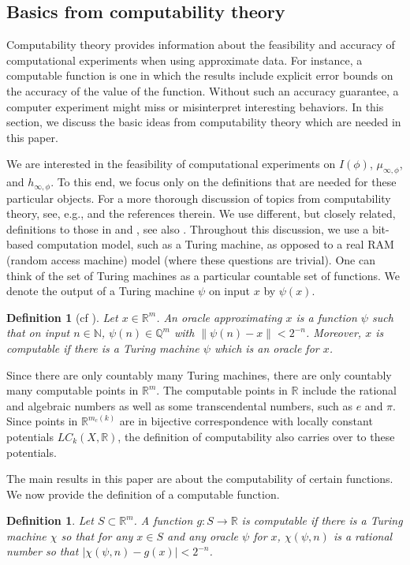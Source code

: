 \documentclass[11pt, reqno]{amsart}
\newtheorem{definition}[theorem]{Definition}
\newcommand{\bR}{{\mathbb R}}
\newcommand{\bN}{{\mathbb N}}
\newcommand{\bQ}{{\mathbb Q}}
\begin{document}
\subsection{Basics from computability theory}\label{sec:compute:basic}

Computability theory provides information about the feasibility and accuracy of computational experiments when using approximate data.  For instance, a computable function is one in which the results include explicit error bounds on the accuracy of the value of the function.  Without such an accuracy guarantee, a computer experiment might miss or misinterpret interesting behaviors.  In this section, we discuss the basic ideas from computability theory which are needed in this paper.

We are interested in the feasibility of computational experiments on $I(\phi)$, $\mu_{\infty,\phi}$, and $h_{\infty,\phi}$.  To this end, we focus only on the definitions that are needed for these particular objects.  For a more thorough discussion of topics from computability theory, see, e.g., \cite{BBRY,BHW, BY,BSW,GHR,RW,RYSurvey,K} and the references therein.  We use different, but closely related, definitions to those in \cite{BY} and \cite{GHR}, see also \cite{BSW}.  Throughout this discussion, we use a bit-based computation model, such as a Turing machine, as opposed to a real RAM (random access machine) model \cite{S} (where these questions are trivial).  One can think of the set of Turing machines as a particular countable set of functions.  We denote the output of a Turing machine $\psi$ on input $x$ by $\psi(x)$.
\begin{definition}[cf {\cite[Definition 1.2.1]{BY}}]
Let $x\in\bR^m$.  An {\em oracle} approximating $x$ is a function $\psi$ such that on input $n\in \bN$, $\psi(n)\in\bQ^m$ with $\|\psi(n)-x\|<2^{-n}$.  Moreover, $x$ is {\em computable} if there is a Turing machine $\psi$ which is an oracle for $x$.
\end{definition}

Since there are only countably many Turing machines, there are only countably many computable points in $\bR^m$.  The computable points in $\bR$ include the rational and algebraic numbers as well as some transcendental numbers, such as $e$ and $\pi$.  Since points in $\bR^{m_c(k)}$ are in bijective correspondence with locally constant potentials $LC_k(X,\bR)$, the definition of computability also carries over to these potentials.  

The main results in this paper are about the computability of certain functions.  We now provide the definition of a computable function.
\begin{definition}
Let $S\subset\bR^m$.  A function $g:S\rightarrow\bR$ is {\em computable} if there is a Turing machine $\chi$ so that for any $x\in S$ and any oracle $\psi$ for $x$, $\chi(\psi,n)$ is a rational number so that $|\chi(\psi,n)-g(x)|<2^{-n}$.
\end{definition}
\end{document}
